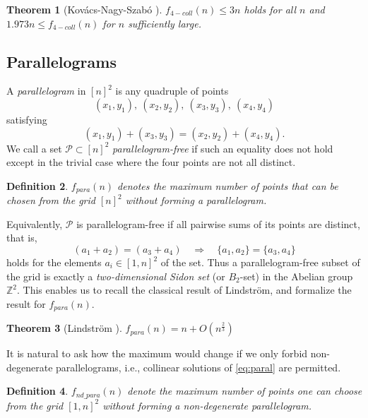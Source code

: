 \documentclass[11pt]{article}
\theoremstyle{plain}
\newtheorem{theorem}{\bf Theorem}[section]
\newtheorem{defi}[theorem]{\bf Definition}
\newcommand\cP{{\mathcal P}}
\begin{document}
	\begin{theorem}[Kovács-Nagy-Szabó \cite{knsz}]\label{k=3}     $  f_{4-coll}(n)\le 3n$ holds for all $n$ and
		$ 1.973 n\le f_{4-coll}(n)$ for $n$ sufficiently large.
	\end{theorem}
	
	\subsection{Parallelograms}
	
	A \emph{parallelogram} in $[n]^2$ is any quadruple of points
	\[
	(x_1,y_1),\ (x_2,y_2),\ (x_3,y_3),\ (x_4,y_4)
	\]
	satisfying
	\begin{equation}\label{eq:paral}
		(x_1,y_1)+(x_3,y_3) = (x_2,y_2)+(x_4,y_4).
	\end{equation}
	We call a set $\cP\subset [n]^2$ \emph{parallelogram-free} if such an equality does
	not hold except in the trivial case where the four points are not all distinct.
	
	\begin{defi}
		$f_{para}(n)$ denotes the maximum number of points that can be chosen from the grid $[n]^2$ without forming a parallelogram.
	\end{defi}
	
	
	
	Equivalently, $\cP$ is parallelogram-free if all pairwise sums of its points are
	distinct, that is,
	\[
	(a_1+a_2)=(a_3+a_4)\quad\Longrightarrow\quad \{a_1,a_2\}=\{a_3,a_4\}
	\] holds for the elements $a_i\in [1,n]^2$ of the set.
	Thus a parallelogram-free subset of the grid is exactly a
	\emph{two-dimensional Sidon set} (or $B_2$-set) in the Abelian group $\mathbb Z^2$. This enables us to recall the classical result of Lindström, and formalize the result for    $f_{para}(n)$.
	
	
	\begin{theorem} [Lindström \cite{Lindstrom}]
		$f_{para}(n) = n + O(n^\frac{2}{3})$
	\end{theorem}
	
	It is natural to ask how the maximum would change if we only forbid non-degenerate parallelograms, i.e., collinear solutions of \eqref{eq:paral} are permitted.
	
	
	\begin{defi}
		$f_{nd\_para}(n)$ denote the maximum number of points one can choose from the grid $[1,n]^2$ without forming a non-degenerate parallelogram. 
	\end{defi}
	
\end{document}

